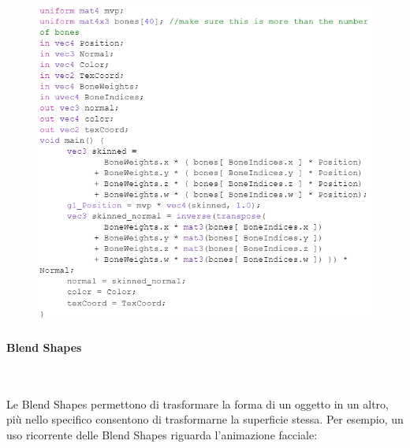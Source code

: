 \begin{figure}[ht!]
  \centering
  \includegraphics[scale=0.9]{Images/IntroductionPic/LBShape.png}
  \label{fig:LBShape}
\end{figure}

\newpage

\paragraph{Blend Shapes}~

Le Blend Shapes permettono di trasformare la forma di un oggetto in un altro, più nello specifico consentono di trasformarne la superficie stessa.
Per esempio, un uso ricorrente delle Blend Shapes riguarda l’animazione facciale:



